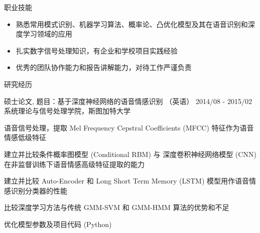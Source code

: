 \documentclass{resume} %
\begin{document}
\begin{CJK*}{UTF8}{gbsn}
 

 
\begin{rSection}{职业技能}  
\begin{itemize}
\item 熟悉常用模式识别、机器学习算法、概率论、凸优化模型及其在语音识别和深度学习领域的应用
\item 扎实数字信号处理知识，有企业和学校项目实践经验
\item 优秀的团队协作能力和报告讲解能力，对待工作严谨负责
\end{itemize}
\end{rSection}


\begin{rSection}{研究经历}

\begin{rSubsection}{硕士论文,  题目：基于深度神经网络的语音情感识别 （英语）
}{2014/08 - 2015/02}{系统理论与信号处理学院，斯图加特大学}{}

\item 语音信号处理，提取 Mel Frequency Cepstral Coefficients (MFCC) 特征作为语音情感低级特征
\item 建立并比较条件概率图模型 (Conditional RBM) 与 深度卷积神经网络模型 (CNN) 在非监督训练下语音情感高级特征提取的能力
\item 建立并比较 Auto-Encoder 和 Long Short Term Memory (LSTM) 模型用作语音情感识别分类器的性能
\item 比较深度学习方法与传统 GMM-SVM 和 GMM-HMM 算法的优势和不足
\item 优化模型参数及项目代码 (Python)


\end{rSubsection}
\end{rSection}
\end{CJK*}
\end{document}

